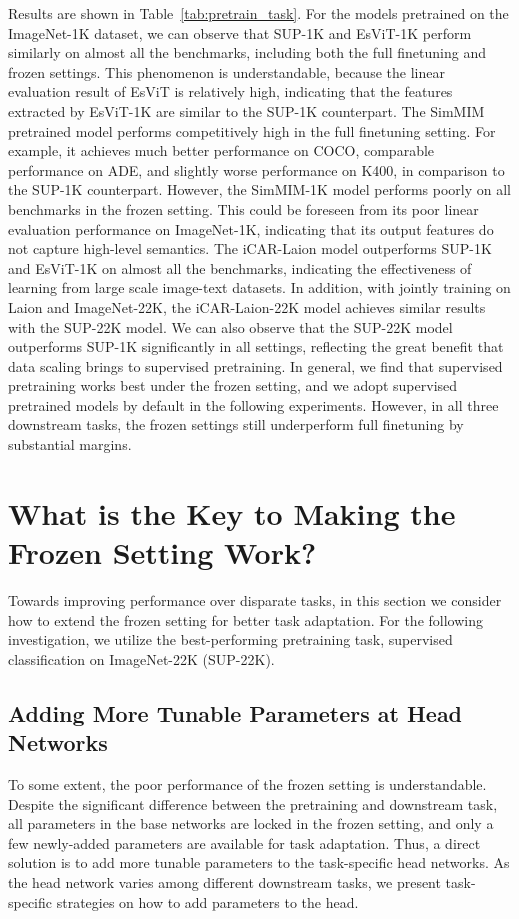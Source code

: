 \documentclass{article}
\begin{document}
Results are shown in Table~\ref{tab:pretrain_task}. For the models pretrained on the ImageNet-1K dataset, we can observe that SUP-1K and EsViT-1K perform similarly on almost all the benchmarks, including both the full finetuning and frozen settings. This phenomenon is understandable, because the linear evaluation result of EsViT is relatively high, indicating that the features extracted by EsViT-1K are similar to the SUP-1K counterpart. The SimMIM pretrained model performs competitively high in the full finetuning setting. For example, it achieves much better performance on COCO, comparable  performance on ADE, and slightly worse performance on K400, in comparison to the SUP-1K counterpart. However, the SimMIM-1K model performs poorly on all benchmarks in the frozen setting. This could be foreseen from its poor linear evaluation performance on ImageNet-1K, indicating that its output features do not capture high-level semantics. The iCAR-Laion model outperforms SUP-1K and EsViT-1K on almost all the benchmarks, indicating the effectiveness of learning from large scale image-text datasets. In addition, with jointly training on Laion and ImageNet-22K, the iCAR-Laion-22K model achieves similar results with the SUP-22K model. We can also observe that the SUP-22K model outperforms SUP-1K significantly in all settings, reflecting the great benefit that data scaling brings to supervised pretraining. In general, we find that supervised pretraining works best under the frozen setting, and we adopt supervised pretrained models by default in the following experiments.  However, in all three downstream tasks, the frozen settings still underperform full finetuning by substantial margins. 

\section{What is the Key to Making the Frozen Setting Work?}
\label{sec:key_to_work}

Towards improving performance over disparate tasks, in this section we consider how to extend the frozen setting for better task adaptation. 
For the following investigation, we utilize the best-performing pretraining task, supervised classification on ImageNet-22K (SUP-22K).

\subsection{Adding More Tunable Parameters at Head Networks} 
To some extent, the poor performance of the frozen setting is understandable. Despite the significant difference between the pretraining and downstream task, all parameters in the base networks are locked in the frozen setting, and only a few newly-added parameters are available for task adaptation. Thus, a direct solution is to add more tunable parameters to the task-specific head networks. As the head network varies among different downstream tasks, we present task-specific strategies on how to add parameters to the head.
\end{document}
